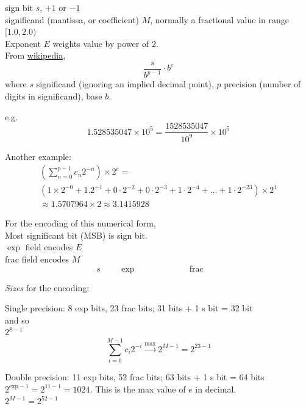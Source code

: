 \documentclass[10pt]{amsart}
\begin{document}
sign bit $s$, $+1$ or $-1$ \\
significand (mantissa, or coefficient) $M$, normally a fractional value in range $[1.0, 2.0)$ \\
Exponent $E$ weights value by power of $2$. \\

From \href{https://en.wikipedia.org/wiki/Floating-point_arithmetic}{wikipedia}, 
\begin{equation}\label{Eqn:FloatingPointRepresentationExplicit}
\frac{s}{b^{p-1}} \cdot b^e
\end{equation}
where $s$ significand (ignoring an implied decimal point), $p$ precision (number of digits in significand), base $b$.

e.g.
\[
1.528535047 \times 10^5 = \frac{ 1528535047 }{ 10^9 } \times 10^5
\]

Another example:
\[
\begin{gathered}
\left( \sum_{n=0}^{p-1} c_n 2^{-n} \right) \times 2^e = \\
(1 \times 2^{-0} + 1.2^{-1} + 0\cdot 2^{-2} + 0 \cdot 2^{-3} + 1\cdot 2^{-4} + \dots + 1\cdot 2^{-23}) \times 2^1 \\
\approx 1.5707964 \times 2 \approx 3.1415928
\end{gathered}
\]

For the encoding of this numerical form, \\

Most significant bit (MSB) is sign bit. \\

$\exp$ field encodes $E$ \\
frac field encodes $M$ \\

\[
s \qquad \, \exp \qquad \, \qquad \qquad \text{frac} \qquad 
\]

\emph{Sizes} for the encoding:

Single precision: 8 exp bits, 23 frac bits; 31 bits + 1 s bit = 32 bit \\
and so \\
$2^{8-1}$ \\
\[
\sum_{i=0}^{M-1} c_i 2^{-i} \xrightarrow{\text{max}} 2^{M-1} = 2^{23-1}
\]

Double precision: 11 exp bits, 52 frac bits; 63 bits + 1 s bit = 64 bits \\
$2^{\text{exp} - 1} = 2^{11 - 1} = 1024$. This is the max value of $e$ in decimal. \\
$2^{M-1} = 2^{52- 1}$
\end{document}
